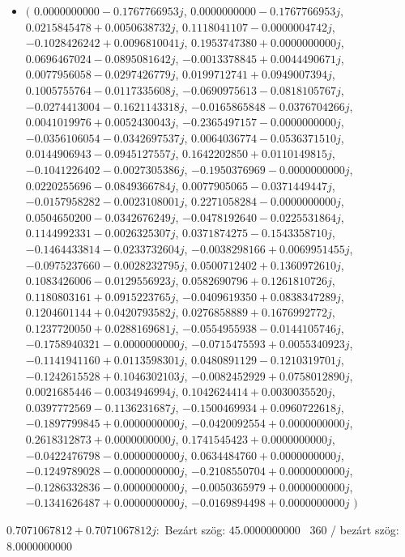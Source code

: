 \documentclass[14pt,a4paper]{article}
\begin{document}
\begin{itemize}
\item
$\big($
$0.0000000000-0.1767766953j$, $0.0000000000-0.1767766953j$, $0.0215845478+0.0050638732j$, $0.1118041107-0.0000004742j$, $-0.1028426242+0.0096810041j$, $0.1953747380+0.0000000000j$, $0.0696467024-0.0895081642j$, $-0.0013378845+0.0044490671j$, $0.0077956058-0.0297426779j$, $0.0199712741+0.0949007394j$, $0.1005755764-0.0117335608j$, $-0.0690975613-0.0818105767j$, $-0.0274413004-0.1621143318j$, $-0.0165865848-0.0376704266j$, $0.0041019976+0.0052430043j$, $-0.2365497157-0.0000000000j$, $-0.0356106054-0.0342697537j$, $0.0064036774-0.0536371510j$, $0.0144906943-0.0945127557j$, $0.1642202850+0.0110149815j$, $-0.1041226402-0.0027305386j$, $-0.1950376969-0.0000000000j$, $0.0220255696-0.0849366784j$, $0.0077905065-0.0371449447j$, $-0.0157958282-0.0023108001j$, $0.2271058284-0.0000000000j$, $0.0504650200-0.0342676249j$, $-0.0478192640-0.0225531864j$, $0.1144992331-0.0026325307j$, $0.0371874275-0.1543358710j$, $-0.1464433814-0.0233732604j$, $-0.0038298166+0.0069951455j$, $-0.0975237660-0.0028232795j$, $0.0500712402+0.1360972610j$, $0.1083426006-0.0129556923j$, $0.0582690796+0.1261810726j$, $0.1180803161+0.0915223765j$, $-0.0409619350+0.0838347289j$, $0.1204601144+0.0420793582j$, $0.0276858889+0.1676992772j$, $0.1237720050+0.0288169681j$, $-0.0554955938-0.0144105746j$, $-0.1758940321-0.0000000000j$, $-0.0715475593+0.0055340923j$, $-0.1141941160+0.0113598301j$, $0.0480891129-0.1210319701j$, $-0.1242615528+0.1046302103j$, $-0.0082452929+0.0758012890j$, $0.0021685446-0.0034946994j$, $0.1042624414+0.0030035520j$, $0.0397772569-0.1136231687j$, $-0.1500469934+0.0960722618j$, $-0.1897799845+0.0000000000j$, $-0.0420092554+0.0000000000j$, $0.2618312873+0.0000000000j$, $0.1741545423+0.0000000000j$, $-0.0422476798-0.0000000000j$, $0.0634484760+0.0000000000j$, $-0.1249789028-0.0000000000j$, $-0.2108550704+0.0000000000j$, $-0.1286332836-0.0000000000j$, $-0.0050365979+0.0000000000j$, $-0.1341626487+0.0000000000j$, $-0.0169894498+0.0000000000j$
$\big)$
\end{itemize}
$0.7071067812+0.7071067812j$:\
Bezárt szög: $45.0000000000$ \
360 / bezárt szög: $8.0000000000$\
\end{document}
